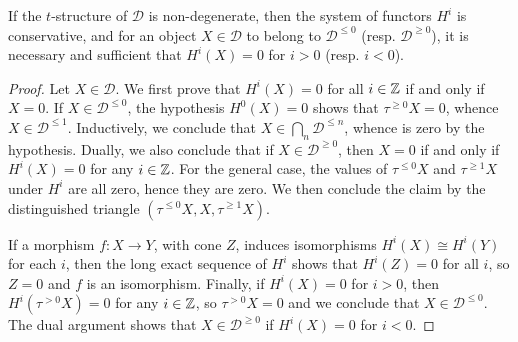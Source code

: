 \begin{proposition}\label{triangle cat t-structure non-degenerate D^leq 0 char by H^i}
If the $t$-structure of $\mathcal{D}$ is non-degenerate, then the system of functors $H^i$ is conservative, and for an object $X\in\mathcal{D}$ to belong to $\mathcal{D}^{\leq 0}$ (resp. $\mathcal{D}^{\geq 0}$), it is necessary and sufficient that $H^i(X)=0$ for $i>0$ (resp. $i<0$).
\end{proposition}
\begin{proof}
Let $X\in\mathcal{D}$. We first prove that $H^i(X)=0$ for all $i\in\mathbb{Z}$ if and only if $X=0$. If $X\in\mathcal{D}^{\leq 0}$, the hypothesis $H^0(X)=0$ shows that $\tau^{\geq 0}X=0$, whence $X\in\mathcal{D}^{\leq 1}$. Inductively, we conclude that $X\in\bigcap_n\mathcal{D}^{\leq n}$, whence is zero by the hypothesis. Dually, we also conclude that if $X\in\mathcal{D}^{\geq 0}$, then $X=0$ if and only if $H^i(X)=0$ for any $i\in\mathbb{Z}$. For the general case, the values of $\tau^{\leq 0}X$ and $\tau^{\geq 1}X$ under $H^i$ are all zero, hence they are zero. We then conclude the claim by the distinguished triangle $(\tau^{\leq 0}X,X,\tau^{\geq 1}X)$.\par
If a morphism $f:X\to Y$, with cone $Z$, induces isomorphisms $H^i(X)\cong H^i(Y)$ for each $i$, then the long exact sequence of $H^i$ shows that $H^i(Z)=0$ for all $i$, so $Z=0$ and $f$ is an isomorphism. Finally, if $H^i(X)=0$ for $i>0$, then $H^i(\tau^{>0}X)=0$ for any $i\in\mathbb{Z}$, so $\tau^{>0}X=0$ and we conclude that $X\in\mathcal{D}^{\leq 0}$. The dual argument shows that $X\in\mathcal{D}^{\geq 0}$ if $H^i(X)=0$ for $i<0$.
\end{proof}

